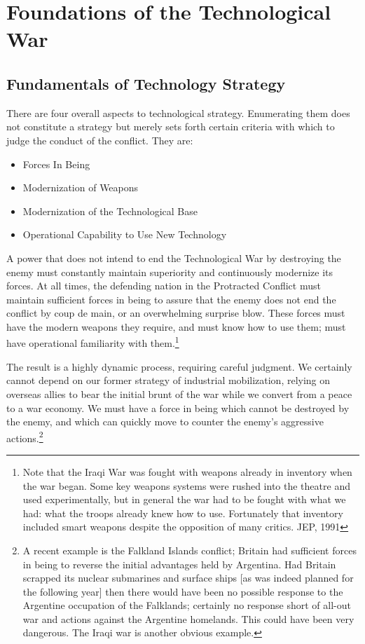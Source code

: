 \documentclass[a4paper,12pt]{book}
\begin{document}
\section{Foundations of the Technological War}
\subsection{Fundamentals of Technology Strategy}
There are four overall aspects to technological strategy. Enumerating them does not constitute a strategy but merely sets forth certain criteria with which to judge the conduct of the conflict. They are:
\begin{itemize}
    \item Forces In Being
    \item Modernization of Weapons
    \item Modernization of the Technological Base
    \item Operational Capability to Use New Technology
\end{itemize}

A power that does not intend to end the Technological War by destroying the enemy must constantly maintain superiority and continuously modernize its forces. At all times, the defending nation in the Protracted Conflict must maintain sufficient forces in being to assure that the enemy does not end the conflict by coup de main, or an overwhelming surprise blow. These forces must have the modern weapons they require, and must know how to use them; must have operational familiarity with them.\footnote{
Note that the Iraqi War was fought with weapons already in inventory when the war began. Some key weapons systems were rushed into the theatre and used experimentally, but in general the war had to be fought with what we had: what the troops already knew how to use. Fortunately that inventory included smart weapons despite the opposition of many critics. JEP, 1991}

The result is a highly dynamic process, requiring careful judgment. We certainly cannot depend on our former strategy of industrial mobilization, relying on overseas allies to bear the initial brunt of the war while we convert from a peace to a war economy. We must have a force in being which cannot be destroyed by the enemy, and which can quickly move to counter the enemy's aggressive actions.\footnote{
A recent example is the Falkland Islands conflict; Britain had sufficient forces in being to reverse the initial advantages held by Argentina. Had Britain scrapped its nuclear submarines and surface ships [as was indeed planned for the following year] then there would have been no possible response to the Argentine occupation of the Falklands; certainly no response short of all-out war and actions against the Argentine homelands. This could have been very dangerous. The Iraqi war is another obvious example.}
\end{document}
